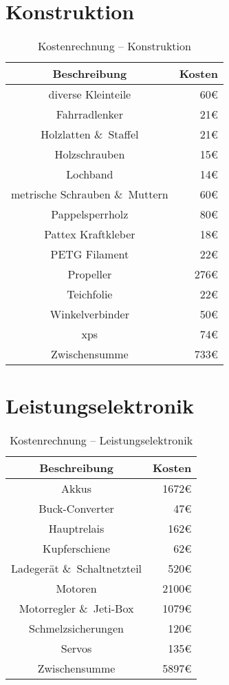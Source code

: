 \section{Konstruktion}
\begin{table}[H]
    \centering
    \begin{tabular}{|c|r|}
        \hline
        \textbf{Beschreibung} & \textbf{Kosten}\\\hline
        diverse Kleinteile & 60\euro\\
        Fahrradlenker & 21\euro\\
        Holzlatten \&\ Staffel & 21\euro\\
        Holzschrauben & 15\euro\\
        Lochband & 14\euro\\
        metrische Schrauben \&\ Muttern & 60\euro\\
        Pappelsperrholz & 80\euro\\
        Pattex Kraftkleber & 18\euro\\
        PETG Filament & 22\euro\\
        Propeller & 276\euro\\
        Teichfolie & 22\euro\\
        Winkelverbinder & 50\euro\\
        \acs{xps} & 74\euro\\        
        \hline
        Zwischensumme & 733\euro\\\hline
    \end{tabular}
    \caption{Kostenrechnung -- Konstruktion}
\end{table}

\section{Leistungselektronik}
\begin{table}[H]
    \centering
    \begin{tabular}{|c|r|}
        \hline
        \textbf{Beschreibung} & \textbf{Kosten}\\\hline
        Akkus & 1672\euro\\
        Buck-Converter & 47\euro\\
        Hauptrelais & 162\euro\\
        Kupferschiene & 62\euro\\
        Ladegerät \&\ Schaltnetzteil & 520\euro\\
        Motoren & 2100\euro\\
        Motorregler \&\ Jeti-Box & 1079\euro\\
        Schmelzsicherungen & 120\euro\\
        Servos & 135\euro\\
        \hline
        Zwischensumme & 5897\euro\\\hline
    \end{tabular}
    \caption{Kostenrechnung -- Leistungselektronik}
\end{table}

